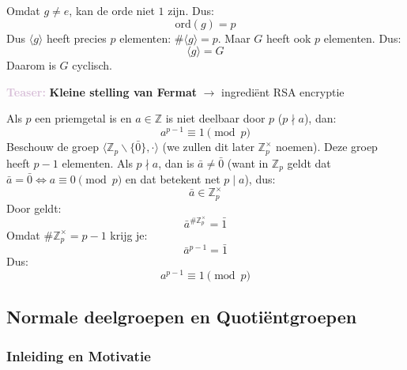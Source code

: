 Omdat $g \neq e$, kan de orde niet $1$ zijn. Dus:
\begin{equation*}
    \text{ord}(g) = p
\end{equation*}
Dus $\langle g \rangle$ heeft precies $p$ elementen: $\#\langle g \rangle = p$. Maar $G$ heeft ook $p$ elementen. Dus:
\begin{equation*}
    \langle g \rangle = G
\end{equation*}
Daarom is $G$ cyclisch.

\begin{barbox}[Thistle][gray!2]
    \textcolor{Thistle}{\textbf{Teaser:}} \textbf{Kleine stelling van Fermat} $\to$ ingrediënt RSA encryptie

    \vspace{0.25cm}

    Als $p$ een priemgetal is en $a \in \mathbb{Z}$ is niet deelbaar door $p$ ($p \nmid a$), dan:
    \begin{equation*}
        a^{p-1} \equiv 1 \pmod p
    \end{equation*}
    Beschouw de groep $\langle\mathbb{Z}_p\backslash\{\bar{0}\},\cdot\rangle$ (we zullen dit later $\mathbb{Z}_p^{\times}$ noemen). Deze groep heeft $p-1$ elementen. Als $p \nmid a$, dan is $\bar{a} \neq \bar{0}$ (want in $\mathbb{Z}_p$ geldt dat $\bar{a} = \bar{0} \iff a \equiv 0 \pmod{p}$ en dat betekent net $p \mid a$), dus:
    \begin{equation*}
        \bar{a} \in \mathbb{Z}_p^{\times}
    \end{equation*}
    Door  geldt:
    \begin{equation*}
        \bar{a}^{\#\mathbb{Z}_p^{\times}} = \bar{1}
    \end{equation*}
    Omdat $\#\mathbb{Z}_p^{\times} = p-1$ krijg je:
    \begin{equation*}
        \bar{a}^{p-1} = \bar{1}
    \end{equation*}
    Dus:
    \begin{equation*}
        a^{p-1} \equiv 1 \pmod{p}
    \end{equation*}
\end{barbox}

\subsection{Normale deelgroepen en Quotiëntgroepen}

\subsubsection{Inleiding en Motivatie}

